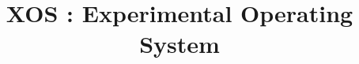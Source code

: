 \documentclass{sig-alternate}
\begin{document}
%
\conferenceinfo{}{}

\title{XOS : Experimental Operating System }

%
%
%
%
%
\end{document}
